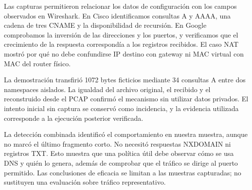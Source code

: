 \documentclass[11pt,a4paper]{article}
\begin{document}
Las capturas permitieron relacionar los datos de configuración con los
campos observados en Wireshark. En Cisco identificamos consultas A y AAAA,
una cadena de tres CNAME y la disponibilidad de recursión. En Google
comprobamos la inversión de las direcciones y los puertos, y verificamos
que el crecimiento de la respuesta correspondía a los registros recibidos.
El caso NAT mostró por qué no debe confundirse IP destino con gateway ni
MAC virtual con MAC del router físico.

La demostración transfirió 1072 bytes ficticios mediante 34 consultas A
entre dos namespaces aislados. La igualdad del archivo original, el recibido
y el reconstruido desde el PCAP confirmó el mecanismo sin utilizar datos
privados. El intento inicial sin captura se conservó como incidencia, y
la evidencia utilizada corresponde a la ejecución posterior verificada.

La detección combinada identificó el comportamiento en nuestra muestra,
aunque no marcó el último fragmento corto. No necesitó respuestas NXDOMAIN
ni registros TXT. Esto muestra que una política útil debe observar cómo
se usa DNS y quién lo genera, además de comprobar que el tráfico se dirige
al puerto permitido. Las conclusiones de eficacia se limitan a las muestras
capturadas; no sustituyen una evaluación sobre tráfico representativo.
\end{document}
